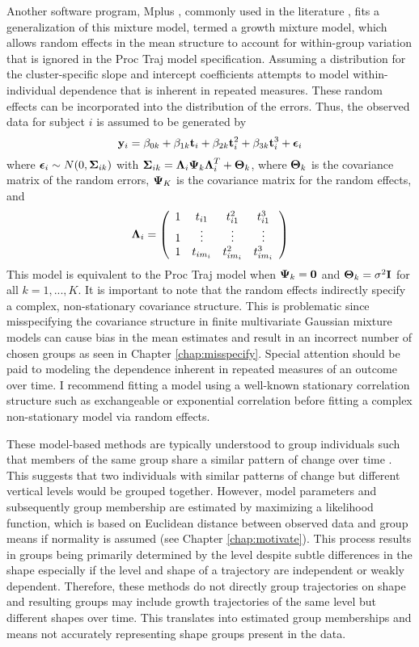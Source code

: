 Another software program, Mplus \cite{muthen2010}, commonly used in the literature \cite{li2007,garden2012}, fits a generalization of this mixture model, termed a growth mixture model, which allows random effects in the mean structure to account for within-group variation that is ignored in the Proc Traj model specification. Assuming a distribution for the cluster-specific slope and intercept coefficients attempts to model within-individual dependence that is inherent in repeated measures. These random effects can be incorporated into the distribution of the errors. Thus, the observed data for subject $i$ is assumed to be generated by
$$\mathbf y_{i} = \beta_{0k}+\beta_{1k} \mathbf t_{i} + \beta_{2k}\mathbf t_{i}^{2}+ \beta_{3k} \mathbf t_{i}^{3} +\boldsymbol \epsilon_{i}$$
where $\boldsymbol\epsilon_{i}\sim N(0,\boldsymbol\Sigma_{ik})$ with $\boldsymbol\Sigma_{ik}=\boldsymbol\Lambda_{i}\boldsymbol\Psi_{k}\boldsymbol\Lambda_{i}^{T}+\boldsymbol\Theta_{k}$, where $\boldsymbol\Theta_{k}$ is the covariance matrix of the random errors, $\boldsymbol\Psi_{K}$ is the covariance matrix for the random effects, and $$\boldsymbol\Lambda_{i}=\left(\begin{array}{cccc}1&t_{i1}&t_{i1}^{2}&t_{i1}^{3}\\ 1&\vdots&\vdots&\vdots\\ 1&t_{im_{i}}&t_{im_{i}}^{2}&t_{im_{i}}^{3} \end{array} \right)$$
This model is equivalent to the Proc Traj model when $\boldsymbol\Psi_{k}=\mathbf 0$ and $\boldsymbol\Theta_{k}=\sigma^{2}\mathbf I$ for all $k=1,...,K$. It is important to note that the random effects indirectly specify a complex, non-stationary covariance structure. This is problematic since misspecifying the covariance structure in finite multivariate Gaussian mixture models can cause bias in the mean estimates and result in an incorrect number of chosen groups as seen in Chapter \ref{chap:misspecify}. Special attention should be paid to modeling the dependence inherent in repeated measures of an outcome over time. I recommend fitting a model using a well-known stationary correlation structure such as exchangeable or exponential correlation before fitting a complex non-stationary model via random effects. 

These model-based methods are typically understood to group individuals such that members of the same group share a similar pattern of change over time \cite{garden2012}. This suggests that two individuals with similar patterns of change but different vertical levels would be grouped together. However, model parameters and subsequently group membership are estimated by maximizing a likelihood function, which is based on Euclidean distance between observed data and group means if normality is assumed (see Chapter \ref{chap:motivate}). This process results in groups being primarily determined by the level despite subtle differences in the shape especially if the level and shape of a trajectory are independent or weakly dependent. Therefore, these methods do not directly group trajectories on shape and resulting groups may include growth trajectories of the same level but different shapes over time. This translates into estimated group memberships and means not accurately representing shape groups present in the data.

